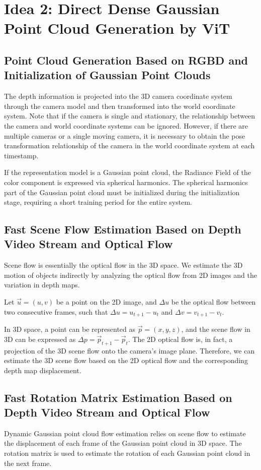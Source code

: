 \section{Idea 2: Direct Dense Gaussian Point Cloud Generation by ViT}

\subsection{Point Cloud Generation Based on RGBD and Initialization of Gaussian Point Clouds}
The depth information is projected into the 3D camera coordinate system through the camera model and then transformed into the world coordinate system. Note that if the camera is single and stationary, the relationship between the camera and world coordinate systems can be ignored. However, if there are multiple cameras or a single moving camera, it is necessary to obtain the pose transformation relationship of the camera in the world coordinate system at each timestamp.

If the representation model is a Gaussian point cloud, the Radiance Field of the color component is expressed via spherical harmonics. The spherical harmonics part of the Gaussian point cloud must be initialized during the initialization stage, requiring a short training period for the entire system.

\subsection{Fast Scene Flow Estimation Based on Depth Video Stream and Optical Flow}
Scene flow is essentially the optical flow in the 3D space. We estimate the 3D motion of objects indirectly by analyzing the optical flow from 2D images and the variation in depth maps.

Let $\vec{u} = (u,v)$ be a point on the 2D image, and $\Delta u$ be the optical flow between two consecutive frames, such that $\Delta u = u_{t+1} - u_t$ and $\Delta v = v_{t+1} - v_t$.

In 3D space, a point can be represented as $\vec{p} = (x, y, z)$, and the scene flow in 3D can be expressed as $\Delta p = \vec{p}_{t+1} - \vec{p}_t$.
The 2D optical flow is, in fact, a projection of the 3D scene flow onto the camera’s image plane. Therefore, we can estimate the 3D scene flow based on the 2D optical flow and the corresponding depth map displacement.

\subsection{Fast Rotation Matrix Estimation Based on Depth Video Stream and Optical Flow}
Dynamic Gaussian point cloud flow estimation relies on scene flow to estimate the displacement of each frame of the Gaussian point cloud in 3D space. The rotation matrix is used to estimate the rotation of each Gaussian point cloud in the next frame.

